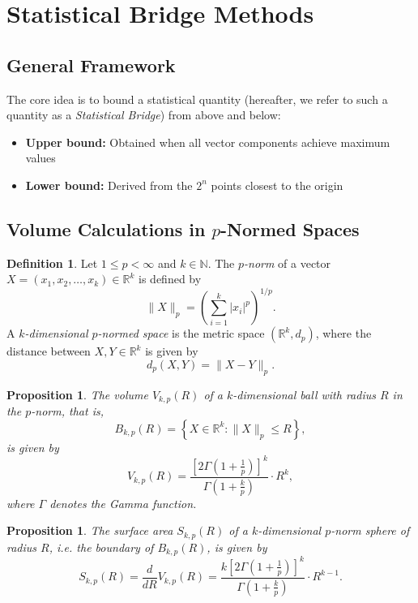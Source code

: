 \documentclass[11pt]{amsart}
\theoremstyle{plain}
\newtheorem{proposition}[theorem]{Proposition}
\theoremstyle{definition}
\newtheorem{definition}[theorem]{Definition}
\numberwithin{equation}{section}
\begin{document}
\section{Statistical Bridge Methods}

\subsection{General Framework}

The core idea is to bound a statistical quantity (hereafter, we refer to such a quantity as a \emph{Statistical Bridge}) from above and below:
\begin{itemize}
\item \textbf{Upper bound:} Obtained when all vector components achieve maximum values
\item \textbf{Lower bound:} Derived from the $2^n$ points closest to the origin
\end{itemize}

\subsection{Volume Calculations in $p$-Normed Spaces}

\begin{definition}
Let $1 \leq p < \infty$ and $k \in \mathbb{N}$. The \emph{$p$-norm} of a vector $X = (x_1, x_2, \ldots, x_k) \in \mathbb{R}^k$ is defined by
\[
    \|X\|_p = \left( \sum_{i=1}^k |x_i|^p \right)^{1/p}.
\]
A \emph{$k$-dimensional $p$-normed space} is the metric space $(\mathbb{R}^k, d_p)$, where the distance between $X, Y \in \mathbb{R}^k$ is given by
\[
    d_p(X, Y) = \|X - Y\|_p.
\]
\end{definition}
   
   \begin{proposition}\label{thm:pnorm-volume}
   The volume $V_{k,p}(R)$ of a $k$-dimensional ball with radius $R$ in the $p$-norm, that is,
   \[
   B_{k,p}(R) = \left\{ X \in \mathbb{R}^k : \|X\|_p \leq R \right\},
   \]
   is given by
   \[
   V_{k,p}(R) = \frac{\left[2\Gamma\left(1+\frac{1}{p}\right)\right]^k}{\Gamma\left(1+\frac{k}{p}\right)} \cdot R^k,
   \]
   where $\Gamma$ denotes the Gamma function.
   \end{proposition}

   \begin{proposition}\label{thm:pnorm-surface}
   The surface area $S_{k,p}(R)$ of a $k$-dimensional $p$-norm sphere of radius $R$, i.e. the boundary of $B_{k,p}(R)$, is given by
   \[
   S_{k,p}(R) = \frac{d}{dR} V_{k,p}(R) = \frac{k \left[2\Gamma\left(1+\frac{1}{p}\right)\right]^k}{\Gamma\left(1+\frac{k}{p}\right)} \cdot R^{k-1}.
   \]
   \end{proposition}
   
\end{document}
